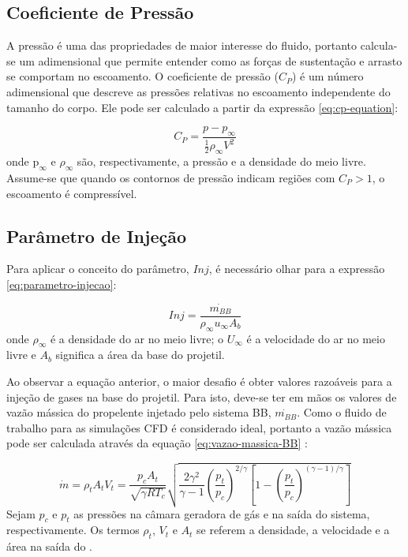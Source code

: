 \subsection{Coeficiente de Pressão}

A pressão é uma das propriedades de maior interesse do fluido, portanto calcula-se um adimensional que permite entender como as forças de sustentação e arrasto se comportam no escoamento. O coeficiente de pressão ($C_{P}$) é um número adimensional que descreve as pressões relativas no escoamento independente do tamanho do corpo. Ele pode ser calculado a partir da expressão \eqref{eq:cp-equation}: 

\begin{equation}\label{eq:cp-equation}
    C_P = \frac{p - p_{\infty}}{\frac{1}{2}\rho_{\infty}V^2}
\end{equation}
%
onde $\text{p}_\infty$ e $\rho_\infty$ são, respectivamente, a pressão e a densidade do meio livre. Assume-se que quando os contornos de pressão indicam regiões com $C_{P} > 1$, o escoamento é compressível.

\subsection{Parâmetro de Injeção}

Para aplicar o conceito do parâmetro, $Inj$, é necessário olhar para a expressão \eqref{eq:parametro-injecao}:

\begin{equation}\label{eq:parametro-injecao}
    Inj = \frac{\Dot{m_{BB}}}{\rho_{\infty}u_{\infty}A_{b}}
\end{equation}
%
onde $\rho_{\infty}$ é a densidade do ar no meio livre; o $U_{\infty}$ é a velocidade do ar no meio livre e $A_{b}$ significa a área da base do projetil. 

Ao observar a equação anterior, o maior desafio é obter valores razoáveis para a injeção de gases na base do projetil. Para isto, deve-se ter em mãos os valores de vazão mássica do propelente injetado pelo sistema BB, $\Dot{m_{BB}}$. Como o fluido de trabalho para as simulações CFD é considerado ideal, portanto a vazão mássica pode ser calculada através da equação \ref{eq:vazao-massica-BB} \cite{Gil2020}:

\begin{equation}\label{eq:vazao-massica-BB}
    \Dot{m} = \rho_{t}A_{t}V_{t} = \frac{p_{c}A_{t}}{\sqrt{\gamma RT_{c}}}\sqrt{\frac{2\gamma^{2}}{\gamma - 1}\left(\frac{p_{t}}{p_{c}}\right)^{2/\gamma}\left[1-\left(\frac{p_{t}}{p_{c}}\right)^{(\gamma-1)/\gamma}\right]}
\end{equation}
%
Sejam $p_{c}$ e $p_{t}$ as pressões na câmara geradora de gás e na saída do sistema, respectivamente. Os termos $\rho_{t}$, $V_{t}$ e $A_{t}$ se referem a densidade, a velocidade e a área na saída do . 

